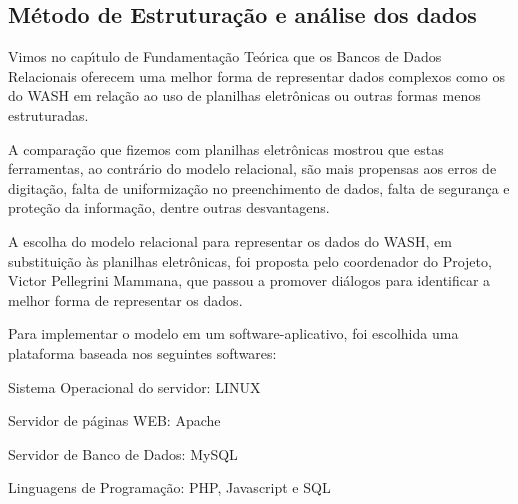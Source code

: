 \documentclass[
12pt,		%
openright,	%
twoside,  %
a4paper,			%
chapter=TITLE,		%
english,			%
french,				%
spanish,			%
brazil				%
]{USPSC-classe/USPSC}
\begin{document}
\subsection[M\'etodo de Estrutura\c{c}\~ao e an\'alise dos dados]{M\'etodo de Estrutura\c{c}\~ao e an\'alise dos dados}\label{M\'etodo de Estrutura\c{c}\~ao e an\'alise dos dados}
Vimos no cap\'{\i}tulo de Fundamenta\c{c}\~ao Te\'orica que os Bancos de Dados Relacionais oferecem uma melhor forma de representar dados complexos como os do WASH em rela\c{c}\~ao ao uso de planilhas eletr\^onicas ou outras formas menos estruturadas.










A compara\c{c}\~ao que fizemos com planilhas eletr\^onicas mostrou que estas ferramentas, ao contr\'ario do modelo relacional, s\~ao mais propensas aos erros de digita\c{c}\~ao, falta de uniformiza\c{c}\~ao no preenchimento de dados, falta de seguran\c{c}a e prote\c{c}\~ao da informa\c{c}\~ao, dentre outras desvantagens.










A escolha do modelo relacional para representar os dados do WASH, em substitui\c{c}\~ao \`as planilhas eletr\^onicas, foi proposta pelo coordenador do Projeto, Victor Pellegrini Mammana, que passou a promover di\'alogos para identificar a melhor forma de representar os dados.










Para implementar o modelo em um software-aplicativo, foi escolhida uma plataforma baseada nos seguintes softwares:











\begin{alineas}
\item Sistema Operacional do servidor: LINUX
\item Servidor de p\'aginas WEB: Apache
\item Servidor de Banco de Dados: MySQL
\item Linguagens de Programa\c{c}\~ao: PHP, Javascript e SQL
\end{alineas}
\end{document}

